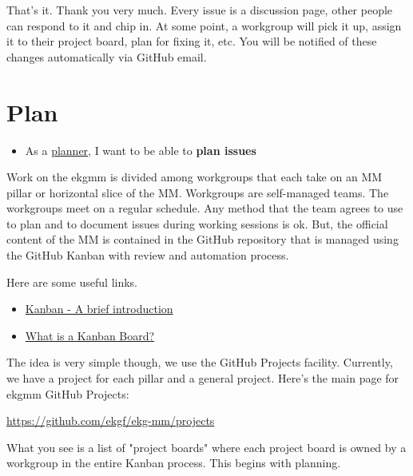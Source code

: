 That’s it. Thank you very much. Every issue is a discussion page,
other people can respond to it and chip in. 
At some point, a workgroup will pick it up, assign it to their project board, 
plan for fixing it, etc. You will be notified of these changes 
automatically via GitHub email.

\section{Plan}
\label{sec:ekg-mm-process-plan}

\begin{tcolorbox}[colback=secondary!5,colframe=secondary!80,title=\textbf{User Stories}]
    \begin{itemize}[leftmargin=1em]
        \item As a \underline{planner}, I want to be able to \textbf{plan issues}
    \end{itemize}
\end{tcolorbox}

Work on the \gls{ekgmm} is divided among workgroups that each take on an MM pillar
or horizontal slice of the MM. 
Workgroups are self-managed teams. 
The workgroups meet on a regular schedule. 
Any method that the team agrees to use to plan and to document issues during 
working sessions is ok. 
But, the official content of the MM is contained in the GitHub repository 
that is managed using the GitHub Kanban with review and automation process.

Here are some useful links. 

\begin{itemize}
    \item \href{https://www.atlassian.com/agile/kanban}{Kanban - A brief introduction}
    \item \href{https://www.atlassian.com/agile/kanban/boards}{What is a Kanban Board?}
\end{itemize}

The idea is very simple though, we use the GitHub Projects facility. 
Currently, we have a project for each pillar and a general project. 
Here’s the main page for \gls{ekgmm} GitHub Projects:

\begin{center}
    \url{https://github.com/ekgf/ekg-mm/projects}
\end{center}

What you see is a list of "project boards" where each project board 
is owned by a workgroup in the entire Kanban process. 
This begins with planning. 

